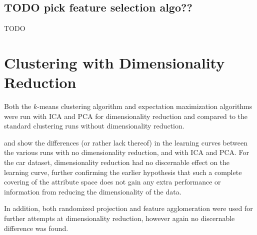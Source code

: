 \documentclass{article}
\begin{document}
    \subsection{TODO pick feature selection algo??}
      TODO

  \section{Clustering with Dimensionality Reduction}
    Both the $k$-means clustering algorithm and expectation maximization algorithms were run with ICA and PCA for dimensionality reduction and compared to the standard clustering runs without dimensionality reduction.

     and  show the differences (or rather lack thereof) in the learning curves between the various runs with no dimensionality reduction, and with ICA and PCA. For the car dataset, dimensionality reduction had no discernable effect on the learning curve, further confirming the earlier hypothesis that such a complete covering of the attribute space does not gain any extra performance or information from reducing the dimensionality of the data.

    In addition, both randomized projection and feature agglomeration were used for further attempts at dimensionality reduction, however again no discernable difference was found.
\end{document}
